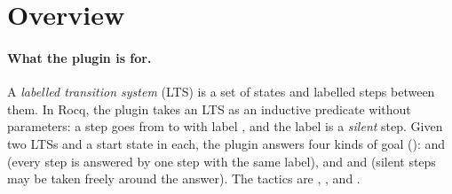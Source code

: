 \section{Overview}\label{sec:overview}

\paragraph{What the plugin is for.} A \emph{labelled transition system}
(LTS) is a set of states and labelled steps between them. In Rocq, the
plugin takes an LTS as an inductive predicate
 without parameters: a step
 goes from  to  with label , and
the label  is a \emph{silent} step. Given two LTSs and a start
state in each, the plugin answers four kinds of goal
():  and
 (every step is answered by one step with the same
label), and  and  (silent steps may be
taken freely around the answer). The tactics are , ,
 and .

